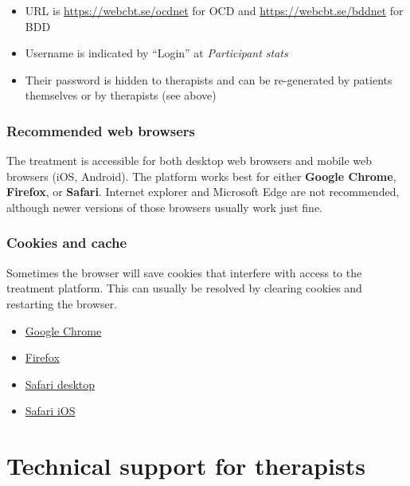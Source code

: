 \documentclass[]{book}
\providecommand{\tightlist}{%
  \setlength{\itemsep}{0pt}\setlength{\parskip}{0pt}}
\theoremstyle{definition}
\theoremstyle{definition}
\theoremstyle{definition}
\theoremstyle{remark}
\begin{document}
\begin{itemize}
\tightlist
\item
  URL is \url{https://webcbt.se/ocdnet} for OCD and
  \url{https://webcbt.se/bddnet} for BDD
\item
  Username is indicated by ``Login'' at \emph{Participant stats}
\item
  Their password is hidden to therapists and can be re-generated by
  patients themselves or by therapists (see above)
\end{itemize}

\hypertarget{recommended-web-browsers}{%
\subsubsection{Recommended web
browsers}\label{recommended-web-browsers}}

The treatment is accessible for both desktop web browsers and mobile web
browsers (iOS, Android). The platform works best for either
\textbf{Google Chrome}, \textbf{Firefox}, or \textbf{Safari}. Internet
explorer and Microsoft Edge are not recommended, although newer versions
of those browsers usually work just fine.

\hypertarget{cookies-and-cache}{%
\subsubsection{Cookies and cache}\label{cookies-and-cache}}

Sometimes the browser will save cookies that interfere with access to
the treatment platform. This can usually be resolved by clearing cookies
and restarting the browser.

\begin{itemize}
\tightlist
\item
  \href{https://support.google.com/chrome/answer/95647?co=GENIE.Platform\%3DDesktop\&hl=en}{Google
  Chrome}
\item
  \href{https://support.mozilla.org/en-US/kb/delete-cookies-remove-info-websites-stored}{Firefox}
\item
  \href{https://support.apple.com/kb/ph21411?locale=en_US}{Safari
  desktop}
\item
  \href{https://support.apple.com/en-gb/HT201265}{Safari iOS}
\end{itemize}

\hypertarget{technical-support-for-therapists}{%
\section{Technical support for
therapists}\label{technical-support-for-therapists}}
\end{document}
